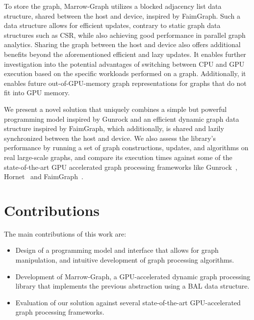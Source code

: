 To store the graph, Marrow-Graph utilizes a blocked adjacency list data structure, shared between the host and device, inspired by FaimGraph. Such a data structure allows for efficient updates, contrary to static graph data structures such as \gls{CSR}, while also achieving good performance in parallel graph analytics. Sharing the graph between the host and device also offers additional benefits beyond the aforementioned efficient and lazy updates. It enables further investigation into the potential advantages of switching between \gls{CPU} and \gls{GPU} execution based on the specific workloads performed on a graph. Additionally, it enables future out-of-GPU-memory graph representations for graphs that do not fit into \gls{GPU} memory.

We present a novel solution that uniquely combines a simple but powerful programming model inspired by Gunrock and an efficient dynamic graph data structure inspired by FaimGraph, which additionally, is shared and lazily synchronized between the host and device.
We also assess the library's performance by running a set of graph constructions, updates, and algorithms on real large-scale graphs, and compare its execution times against some of the state-of-the-art \gls{GPU} accelerated graph processing frameworks like Gunrock~\cite{paper:gunrock}, Hornet~\cite{paper:hornet} and FaimGraph~\cite{paper:faimgraph}.


\section{Contributions}

The main contributions of this work are:
\begin{itemize}
    \item Design of a programming model and interface that allows for graph manipulation, and intuitive development of graph processing algorithms.
    \item Development of Marrow-Graph, a \gls{GPU}-accelerated dynamic graph processing library that implements the previous abstraction using a \gls{BAL} data structure. %
    \item Evaluation of our solution against several state-of-the-art \gls{GPU}-accelerated graph processing frameworks.
\end{itemize}

